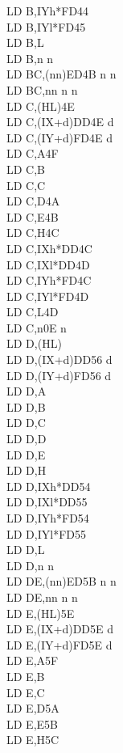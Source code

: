 \documentclass[oneside,a4paper]{book}
\begin{document}
\begin{multicols}{3}
{\begin{tabbing}
LD B,IYh*\>FD44\\
LD B,IYl*\>FD45\\
LD B,L\\
LD B,n n\\
LD BC,(nn)\>ED4B n n\\
LD BC,nn n n\\
LD C,(HL)\>4E\\
LD C,(IX+d)\>DD4E d\\
LD C,(IY+d)\>FD4E d\\
LD C,A\>4F\\
LD C,B\\
LD C,C\\
LD C,D\>4A\\
LD C,E\>4B\\
LD C,H\>4C\\
LD C,IXh*\>DD4C\\
LD C,IXl*\>DD4D\\
LD C,IYh*\>FD4C\\
LD C,IYl*\>FD4D\\
LD C,L\>4D\\
LD C,n\>0E n\\
LD D,(HL)\\
LD D,(IX+d)\>DD56 d\\
LD D,(IY+d)\>FD56 d\\
LD D,A\\
LD D,B\\
LD D,C\\
LD D,D\\
LD D,E\\
LD D,H\\
LD D,IXh*\>DD54\\
LD D,IXl*\>DD55\\
LD D,IYh*\>FD54\\
LD D,IYl*\>FD55\\
LD D,L\\
LD D,n n\\
LD DE,(nn)\>ED5B n n\\
LD DE,nn n n\\
LD E,(HL)\>5E\\
LD E,(IX+d)\>DD5E d\\
LD E,(IY+d)\>FD5E d\\
LD E,A\>5F\\
LD E,B\\
LD E,C\\
LD E,D\>5A\\
LD E,E\>5B\\
LD E,H\>5C\\

\end{tabbing}}
\end{multicols}
\end{document}
